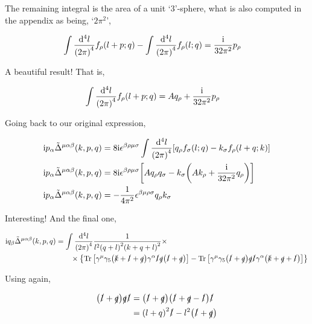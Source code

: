 The remaining integral is the area of a unit `$3$'-sphere, what is also computed in the appendix as being, `$2\pi^2$', 

\begin{align}
    \int\frac{\dd[4]{l}}{\qty(2\pi)^4}f_\rho\qty(l+p;q)-\int\frac{\dd[4]{l}}{\qty(2\pi)^4}f_\rho\qty(l;q)
    &=\frac{\textnormal{i}}{32\pi^2}p_\rho\nonumber
\end{align}

A beautiful result! That is,

\begin{align}
    \int\frac{\dd[4]{l}}{\qty(2\pi)^4}f_\rho\qty(l+p;q)
    &=Aq_\rho+\frac{\textnormal{i}}{32\pi^2}p_\rho\nonumber
\end{align}

Going back to our original expression,

\begin{align}
    \textnormal{i} p_\alpha{\tilde\Delta}^{\mu\alpha\beta}\qty(k,p,q)&=8\textnormal{i}\epsilon^{\beta\rho\mu\sigma}
    \int\frac{\dd[4]{l}}{\qty(2\pi)^4}\qty[q_\rho f_\sigma\qty(l;q)-k_\sigma f_\rho\qty(l+q;k)]\nonumber\\
    \textnormal{i} p_\alpha{\tilde\Delta}^{\mu\alpha\beta}\qty(k,p,q)&=8\textnormal{i}\epsilon^{\beta\rho\mu\sigma}
    \qty[Aq_\rho q_\sigma -k_\sigma\qty(A k_\rho+\frac{\textnormal{i}}{32\pi^2}q_\rho)]\nonumber\\
    \textnormal{i} p_\alpha{\tilde\Delta}^{\mu\alpha\beta}\qty(k,p,q)&=-\frac{1}{4\pi^2}\epsilon^{\beta\mu\rho\sigma}
     q_\rho k_\sigma\nonumber
\end{align}

Interesting! And the final one,

\begin{align}
    \textnormal{i} q_\beta{\tilde\Delta}^{\mu\alpha\beta}\qty(k,p,q)&=
    \int\frac{\dd[4]{l}}{\qty(2\pi)^4}\frac{1}{l^2\qty(q+l)^2\qty(k+q+l)^2}\times\nonumber\\
    &\quad\quad\times\qty{
    \Tr\qty[\gamma^\mu\gamma_5\qty(\slashed {k}+\slashed{l}+\slashed q)\gamma^\alpha\slashed {l}\slashed q \qty(\slashed {l}+\slashed q)]
    -\Tr\qty[\gamma^\mu\gamma_5\qty(\slashed {l}+\slashed q)\slashed q\slashed {l}\gamma^\alpha \qty(\slashed {k}+\slashed{q}+\slashed l)]}\nonumber
\end{align}

Using again,

\begin{align}
    \qty(\slashed l+\slashed q)\slashed q\slashed l&=\qty(\slashed l+\slashed q)\qty(\slashed l+\slashed q-\slashed l)\slashed l\nonumber\\
    &=\qty(l+q)^2\slashed l-l^2\qty(\slashed l+\slashed q)\nonumber
\end{align}

